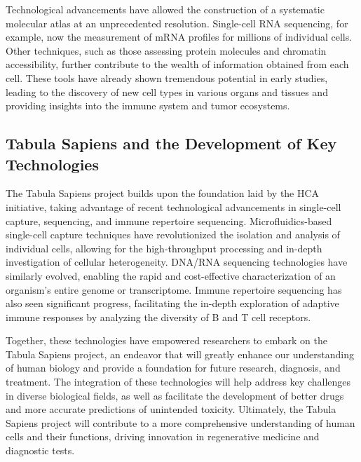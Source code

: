Technological advancements have allowed the construction of a systematic molecular atlas at an unprecedented resolution. Single-cell RNA sequencing, for example, now the measurement of  mRNA profiles for millions of individual cells\cite{svensson2017power}. Other techniques, such as those assessing protein molecules\cite{stoeckius2017simultaneous} and chromatin accessibility\cite{buenrostro2015atac}, further contribute to the wealth of information obtained from each cell. These tools have already shown tremendous potential in early studies, leading to the discovery of new cell types in various organs and tissues and providing insights into the immune system and tumor ecosystems\cite{regev2017human}.

\subsection{Tabula Sapiens and the Development of Key Technologies}

The Tabula Sapiens project builds upon the foundation laid by the HCA initiative, taking advantage of recent technological advancements in single-cell capture, sequencing, and immune repertoire sequencing. Microfluidics-based single-cell capture techniques have revolutionized the isolation and analysis of individual cells, allowing for the high-throughput processing and in-depth investigation of cellular heterogeneity\cite{macosko2015highly, klein_droplet_2015}. DNA/RNA sequencing technologies have similarly evolved, enabling the rapid and cost-effective characterization of an organism's entire genome or transcriptome\cite{goodwin2016coming}. Immune repertoire sequencing has also seen significant progress, facilitating the in-depth exploration of adaptive immune responses by analyzing the diversity of B and T cell receptors\cite{georgiou_promise_2014}.

Together, these technologies have empowered researchers to embark on the Tabula Sapiens project, an endeavor that will greatly enhance our understanding of human biology and provide a foundation for future research, diagnosis, and treatment. The integration of these technologies will help address key challenges in diverse biological fields, as well as facilitate the development of better drugs and more accurate predictions of unintended toxicity. Ultimately, the Tabula Sapiens project will contribute to a more comprehensive understanding of human cells and their functions, driving innovation in regenerative medicine and diagnostic tests.

